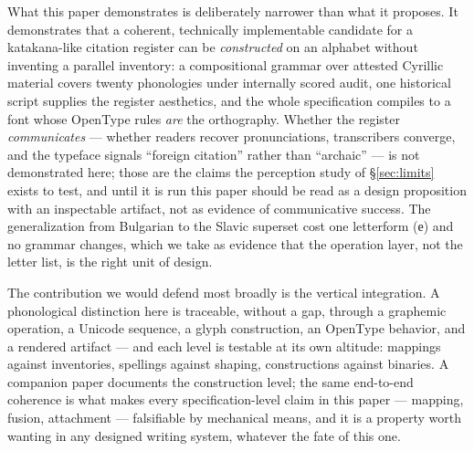 \documentclass[11pt]{article}
\begin{document}
What this paper demonstrates is deliberately narrower than what it proposes. It demonstrates that a coherent, technically implementable candidate for a katakana-like citation register can be \emph{constructed} on an alphabet without inventing a parallel inventory: a compositional grammar over attested Cyrillic material covers twenty phonologies under internally scored audit, one historical script supplies the register aesthetics, and the whole specification compiles to a font whose OpenType rules \emph{are} the orthography. Whether the register \emph{communicates} — whether readers recover pronunciations, transcribers converge, and the typeface signals ``foreign citation'' rather than ``archaic'' — is not demonstrated here; those are the claims the perception study of \S\ref{sec:limits} exists to test, and until it is run this paper should be read as a design proposition with an inspectable artifact, not as evidence of communicative success. The generalization from Bulgarian to the Slavic superset cost one letterform (е) and no grammar changes, which we take as evidence that the operation layer, not the letter list, is the right unit of design.

The contribution we would defend most broadly is the vertical integration. A phonological distinction here is traceable, without a gap, through a graphemic operation, a Unicode sequence, a glyph construction, an OpenType behavior, and a rendered artifact — and each level is testable at its own altitude: mappings against inventories, spellings against shaping, constructions against binaries. A companion paper documents the construction level; the same end-to-end coherence is what makes every specification-level claim in this paper — mapping, fusion, attachment — falsifiable by mechanical means, and it is a property worth wanting in any designed writing system, whatever the fate of this one.
\end{document}
